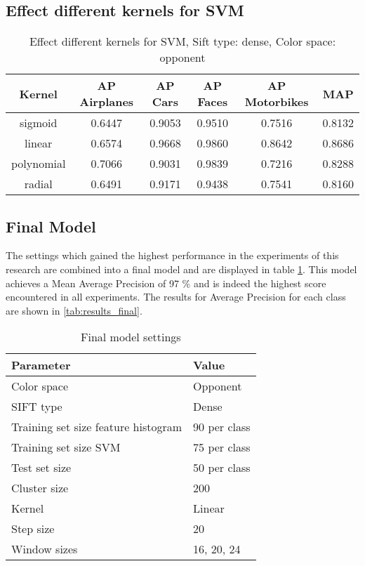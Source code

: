 






\subsection{Effect different kernels for SVM}

\begin{table}[H]
\begin{tabular}{|c|ccccc|}
\hline
\textbf{Kernel} & \textbf{AP Airplanes} & \textbf{AP Cars} & \textbf{AP Faces} & \textbf{AP Motorbikes} & \textbf{MAP}\\
\hline
sigmoid & 0.6447 & 0.9053 & 0.9510 & 0.7516 & 0.8132\\
linear & 0.6574 & 0.9668 & 0.9860 & 0.8642 & 0.8686 \\
polynomial & 0.7066 & 0.9031 & 0.9839& 0.7216& 0.8288\\
radial & 0.6491 & 0.9171 & 0.9438 & 0.7541 & 0.8160\\
\hline
\end{tabular}
\caption{Effect different kernels for SVM, Sift type: dense, Color space: opponent}
\end{table}

\subsection{Final Model}
The settings which gained the highest performance in the experiments of this research are combined into a final model and are displayed in table \ref{tab:final}. This model achieves a Mean Average Precision of 97 \% and is indeed the highest score encountered in all experiments. The results for Average Precision for each class are shown in \ref{tab:results_final}.
 
\begin{table}[H]
\begin{tabular}{|l|l|}
\hline
\textbf{Parameter} & \textbf{Value}\\
\hline
Color space & Opponent\\
SIFT type & Dense\\
Training set size feature histogram & 90 per class\\
Training set size SVM & 75 per class\\
Test set size & 50 per class \\
Cluster size & 200 \\
Kernel & Linear \\
Step size & 20\\
Window sizes & 16, 20, 24\\
\hline
\end{tabular}
\caption{Final model settings}
\label{tab:final}
\end{table}

